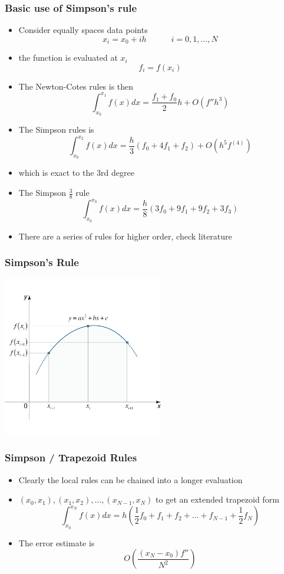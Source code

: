 \documentclass[10pt]{beamer}
\begin{document}
\begin{frame}
  \frametitle{Basic use of Simpson's rule}
  \begin{itemize}
  \item Consider equally spaces data points
    \[
      x_i = x_0 + i h \mbox{ ~~~~~~~~} i = 0, 1, ..., N
    \]

  \item the function is evaluated at $x_i$
    \[
      f_i = f(x_i)
    \]
  \item The Newton-Cotes rules is then
    \[
      \int_{x_0}^{x_1} f(x) dx = \frac{f_1+f_0}{2} h + O(f'' h^3)
    \]
  \item The Simpson rules is
    \[
      \int_{x_0}^{x_2} f(x) dx = \frac{h}{3} (f_0 + 4 f_1 + f_2) + O(h^5 f^{(4)})
    \]
  \item which is exact to the 3rd degree
  \item The Simpson $\frac{3}{8}$ rule
    \[
      \int_{x_0}^{x_3} f(x) dx = \frac{h}{8} (3 f_0 + 9 f_1 + 9 f_2 + 3 f_3)
    \]
  \item There are a series of rules for higher order, check literature
  \end{itemize}
\end{frame}


\begin{frame}
  \frametitle{Simpson's Rule}
  \centerline{\includegraphics[height=7cm]{simpsons-rule}}
\end{frame}

\begin{frame}
  \frametitle{Simpson / Trapezoid Rules}
  \begin{itemize}
  \item Clearly the local rules can be chained into a longer evaluation
  \item $(x_0, x_1), (x_1, x_2), \ldots, (x_{N-1},x_N)$ to get an extended
    trapezoid form
    \[
      \int_{x_0}^{x_N} f(x) dx = h(\frac{1}{2} f_0 + f_1 + f_2 + \ldots + f_{N-1} + \frac{1}{2} f_N )
    \]
  \item The error estimate is
    \[
      O\left( \frac{(x_N - x_0) f''}{N^2} \right)
    \]
  \end{itemize}
\end{frame}
\end{document}
